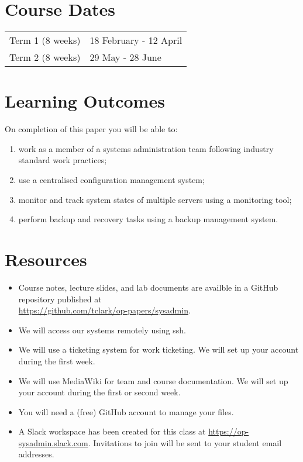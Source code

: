 \documentclass{article}
\begin{document}
\section*{Course Dates}
\begin{tabular}{ll}
Term 1 (8 weeks) & 18 February - 12 April\\
Term 2 (8 weeks) & 29 May - 28 June\\
\end{tabular}

\newpage 

\section*{Learning Outcomes}
On completion of this paper you will be able to:
\begin{enumerate}
  \item work as a member of a systems administration team following industry standard work practices;
  \item use a centralised configuration management system;
  \item monitor and track system states of multiple servers using a monitoring tool;
  \item perform backup and recovery tasks using a backup management system.
\end{enumerate}

\section*{Resources}
\begin{itemize}
	\item Course notes, lecture slides, and lab documents are availble in a GitHub repository published at \\ \url{https://github.com/tclark/op-papers/sysadmin}.
	\item We will access our systems remotely using ssh.
	\item We will use a ticketing system for work ticketing. We will set up your account during the first week.
	\item We will use MediaWiki for team and course documentation. We will set up your account during the first or second week.
	\item You will need a (free) GitHub account to manage your files.
	\item A Slack workspace has been created for this class at \url{https://op-sysadmin.slack.com}. Invitations to join will be sent to your student email addresses.
\end{itemize}
\end{document}
